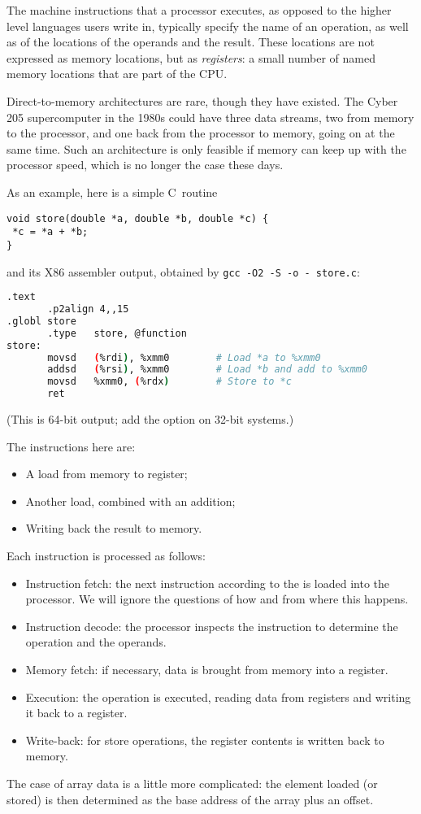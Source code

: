The machine instructions that a processor executes, as opposed to the
higher level languages users write in, typically specify the name of
an operation, as well as of the locations of the operands and the
result. These locations are not expressed as memory locations, but as
\emph{registers}: a small number of named memory locations that
are part of the \ac{CPU}.
\begin{remark}
Direct-to-memory architectures are rare,
  though they have existed. The Cyber 205 supercomputer in the 1980s
  could have three data streams, two from memory to the processor, and one
  back from the processor to memory, going on at the same time. Such
  an architecture is only feasible if memory can keep up with the
  processor speed, which is no longer the case these days.
\end{remark}
As an
example, here is a simple C~routine
\begin{lstlisting}
void store(double *a, double *b, double *c) {
 *c = *a + *b;
}
\end{lstlisting}
and its X86 assembler output, obtained by
\verb+gcc -O2 -S -o - store.c+:
\begin{lstlisting}[language=Bash]
       .text
       .p2align 4,,15
.globl store
       .type   store, @function
store:
       movsd   (%rdi), %xmm0		# Load *a to %xmm0
       addsd   (%rsi), %xmm0		# Load *b and add to %xmm0
       movsd   %xmm0, (%rdx)		# Store to *c
       ret
\end{lstlisting}
(This is 64-bit
    output; add the option  on 32-bit systems.)

The instructions here are:
\begin{itemize}
\item A load from memory to register;
\item Another load, combined with an addition;
\item Writing back the result to memory.
\end{itemize}
Each instruction is processed as follows:
\begin{itemize}
\item Instruction fetch: the next instruction according to the
   is loaded into the processor. We will
  ignore the questions of how and from where this happens.
\item Instruction decode: the processor inspects the instruction to
  determine the operation and the operands.
\item Memory fetch: if necessary, data is brought from memory
    into a register.
\item Execution: the operation is executed, reading data from registers
  and writing it back to a register.
\item Write-back: for store operations, the register contents is
  written back to memory.
\end{itemize}
The case of array data is a little more complicated: the element
loaded (or stored) is then determined as the base address of the array
plus an offset.

